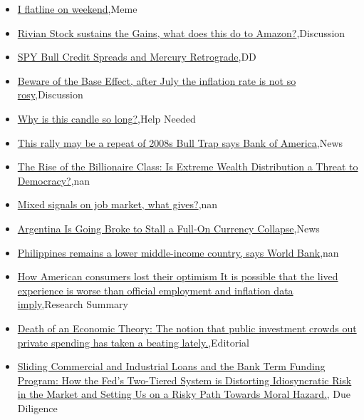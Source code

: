 \documentclass{article}%
\begin{document}
%
\begin{itemize}%
\item%
\href{https://reddit.com/r/wallstreetbets/comments/14trh9k/i\_flatline\_on\_weekend/}{I flatline on weekend},Meme%
\item%
\href{https://reddit.com/r/wallstreetbets/comments/14tqq4i/rivian\_stock\_sustains\_the\_gains\_what\_does\_this\_do/}{Rivian Stock sustains the Gains, what does this do to Amazon?},Discussion%
\item%
\href{https://reddit.com/r/wallstreetbets/comments/14tpap3/spy\_bull\_credit\_spreads\_and\_mercury\_retrograde/}{SPY Bull Credit Spreads and Mercury Retrograde},DD%
\item%
\href{https://reddit.com/r/StockMarket/comments/14tehfl/beware\_of\_the\_base\_effect\_after\_july\_the/}{Beware of the Base Effect, after July the inflation rate is not so rosy},Discussion%
\item%
\href{https://reddit.com/r/StockMarket/comments/14tdvje/why\_is\_this\_candle\_so\_long/}{Why is this candle so long?},Help Needed%
\item%
\href{https://reddit.com/r/StockMarket/comments/14t98vx/this\_rally\_may\_be\_a\_repeat\_of\_2008s\_bull\_trap/}{This rally may be a repeat of 2008s Bull Trap says Bank of America},News%
\item%
\href{https://reddit.com/r/Economics/comments/14u1t35/the\_rise\_of\_the\_billionaire\_class\_is\_extreme/}{The Rise of the Billionaire Class: Is Extreme Wealth Distribution a Threat to Democracy?},nan%
\item%
\href{https://reddit.com/r/Economics/comments/14tpum4/mixed\_signals\_on\_job\_market\_what\_gives/}{Mixed signals on job market, what gives?},nan%
\item%
\href{https://reddit.com/r/Economics/comments/14tkyjh/argentina\_is\_going\_broke\_to\_stall\_a\_fullon/}{Argentina Is Going Broke to Stall a Full-On Currency Collapse},News%
\item%
\href{https://reddit.com/r/Economics/comments/14td8zi/philippines\_remains\_a\_lower\_middleincome\_country/}{Philippines remains a lower middle-income country, says World Bank},nan%
\item%
\href{https://reddit.com/r/Economics/comments/14t7g4q/how\_american\_consumers\_lost\_their\_optimism\_it\_is/}{How American consumers lost their optimism  It is possible that the lived experience is worse than official employment and inflation data imply},Research Summary%
\item%
\href{https://reddit.com/r/Economics/comments/14t75ws/death\_of\_an\_economic\_theory\_the\_notion\_that/}{Death of an Economic Theory: The notion that public investment crowds out private spending has taken a beating lately.},Editorial%
\item%
\href{https://reddit.com/r/Superstonk/comments/14tsmdf/sliding\_commercial\_and\_industrial\_loans\_and\_the/}{Sliding Commercial and Industrial Loans and the Bank Term Funding Program: How the Fed's Two-Tiered System is Distorting Idiosyncratic Risk in the Market and Setting Us on a Risky Path Towards Moral Hazard.}, Due Diligence%
\end{itemize}%
\end{document}
